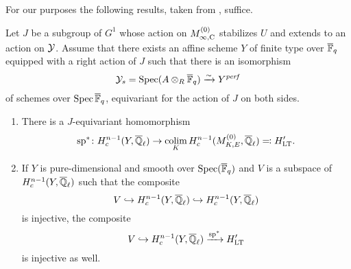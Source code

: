 \documentclass[../main.tex]{subfiles}
\begin{document}
For our purposes the following results, taken from \cite[Corollary
4.6]{mieda2016geometric}, suffice.
\begin{thm}\label{thm:MiedaAppliedToLTT}
  Let $J$ be a subgroup of $G^1$ whose action on $M_{\infty, {\mathrm{C}}}^{(0)}$ 
  stabilizes $U$ and extends to an action on $\mathcal{Y}$. Assume that there exists an
  affine scheme $Y$ of finite type over ${\overline {\mathbb{F}}_q}$ equipped with a right action of 
  $J$ such that there is an isomorphism
  \begin{equation*}
    \mathcal{Y}_s = \operatorname{Spec}(A \otimes_{R} {\overline {\mathbb{F}}_q}) \xrightarrow{\sim} Y^{\mathit{perf}}
  \end{equation*}
  of schemes over $\operatorname{Spec} {\overline {\mathbb{F}}_q}$, equivariant for the action of $J$ on both sides.
  \begin{enumerate}
    \item There is a $J$-equivariant homomorphism
      \begin{equation*}
        \mathrm{sp}^*\colon H_c^{n-1}(Y, \overline {\mathbb{Q}}_\ell) \to \operatorname*{colim}_K H_c^{n-1}
        (M_{K, E}^{(0)}, \overline {\mathbb{Q}}_\ell) \eqcolon H_{\mathrm{LT}}'.
      \end{equation*}
    \item If $Y$ is pure-dimensional and smooth over $\operatorname{Spec}({\overline {\mathbb{F}}_q})$
      and $V$ is a subspace of $H^{n-1}_c(Y, \overline {\mathbb{Q}}_\ell)$ such that the
      composite 
      $$V \hookrightarrow H^{n-1}_c(Y, \overline {\mathbb{Q}}_\ell) \hookrightarrow H^{n-1}_c(Y, \overline {\mathbb{Q}}_\ell)$$
      is injective, the composite
      \begin{equation*}
        V \hookrightarrow H^{n-1}_c(Y, \overline {\mathbb{Q}}_\ell) \xrightarrow{\mathrm{sp}^*} H_{\mathrm{LT}}'
      \end{equation*}
      is injective as well.
  \end{enumerate}
\end{thm}


\end{document}
